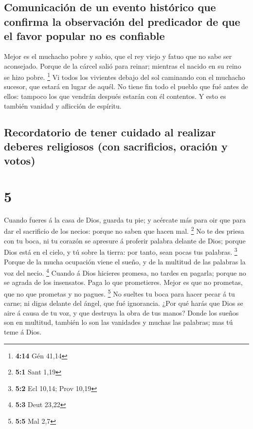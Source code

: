 \hypertarget{comunicaciuxf3n-de-un-evento-histuxf3rico-que-confirma-la-observaciuxf3n-del-predicador-de-que-el-favor-popular-no-es-confiable}{%
\subsection{Comunicación de un evento histórico que confirma la
observación del predicador de que el favor popular no es
confiable}\label{comunicaciuxf3n-de-un-evento-histuxf3rico-que-confirma-la-observaciuxf3n-del-predicador-de-que-el-favor-popular-no-es-confiable}}

 Mejor es el muchacho pobre y sabio, que el rey viejo y
fatuo que no sabe ser aconsejado.  Porque de la cárcel
salió para reinar; mientras el nacido en su reino se hizo pobre.
\footnote{\textbf{4:14} Gén 41,14}  Vi todos los
vivientes debajo del sol caminando con el muchacho sucesor, que estará
en lugar de aquél.  No tiene fin todo el pueblo que fué
antes de ellos: tampoco los que vendrán después estarán con él
contentos. Y esto es también vanidad y aflicción de espíritu.

\hypertarget{recordatorio-de-tener-cuidado-al-realizar-deberes-religiosos-con-sacrificios-oraciuxf3n-y-votos}{%
\subsection{Recordatorio de tener cuidado al realizar deberes religiosos
(con sacrificios, oración y
votos)}\label{recordatorio-de-tener-cuidado-al-realizar-deberes-religiosos-con-sacrificios-oraciuxf3n-y-votos}}

\hypertarget{section-4}{%
\section{5}\label{section-4}}

 Cuando fueres á la casa de Dios, guarda tu pie; y
acércate más para oir que para dar el sacrificio de los necios: porque
no saben que hacen mal. \footnote{\textbf{5:1} Sant 1,19} 
No te des priesa con tu boca, ni tu corazón se apresure á proferir
palabra delante de Dios; porque Dios está en el cielo, y tú sobre la
tierra: por tanto, sean pocas tus palabras. \footnote{\textbf{5:2} Ecl
  10,14; Prov 10,19}  Porque de la mucha ocupación viene
el sueño, y de la multitud de las palabras la voz del necio. \footnote{\textbf{5:3}
  Deut 23,22}  Cuando á Dios hicieres promesa, no tardes
en pagarla; porque no se agrada de los insensatos. Paga lo que
prometieres.  Mejor es que no prometas, que no que
prometas y no pagues. \footnote{\textbf{5:5} Mal 2,7}  No
sueltes tu boca para hacer pecar á tu carne; ni digas delante del ángel,
que fué ignorancia. ¿Por qué harás que Dios se aire á causa de tu voz, y
que destruya la obra de tus manos?  Donde los sueños son
en multitud, también lo son las vanidades y muchas las palabras; mas tú
teme á Dios.

